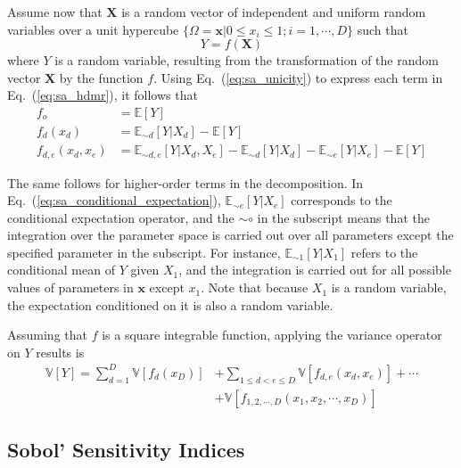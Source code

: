 Assume now that $\mathbf{X}$ is a random vector of independent and uniform random variables over a unit hypercube
$\{\Omega = \mathbf{x} | 0 \leq x_i  \leq 1; i = 1,\cdots, D\}$ such that
\begin{equation}
	Y = f(\mathbf{X})
\label{eq:sa_random_function}
\end{equation}
where $Y$ is a random variable, resulting from the transformation of the random vector $\mathbf{X}$ by the function $f$.
Using Eq.~(\ref{eq:sa_unicity}) to express each term in Eq.~(\ref{eq:sa_hdmr}), it follows that
\begin{equation}
	\begin{split}
		f_o & = \mathbb{E}[Y] \\
	  f_d(x_d) & = \mathbb{E}_{\sim d}[Y|X_d] - \mathbb{E}[Y]\\
    f_{d,e}(x_d,x_e) & = \mathbb{E}_{\sim d,e} [Y|X_d, X_e] - \mathbb{E}_{\sim d}[Y|X_d] - \mathbb{E}_{\sim e}[Y|X_e] - \mathbb{E}[Y] 
	\end{split}
\label{eq:sa_conditional_expectation}
\end{equation}

The same follows for higher-order terms in the decomposition. 
In Eq.~(\ref{eq:sa_conditional_expectation}), $\mathbb{E}_{\sim e} [Y|X_e]$ corresponds to the conditional expectation operator,
and the $\sim\circ$ in the subscript means that the integration over the parameter space is carried out over all parameters except the specified parameter in the subscript.
For instance, $\mathbb{E}_{\sim 1} [Y|X_1]$ refers to the conditional mean of $Y$ given $X_1$, and the integration is carried out for all possible values of parameters in $\mathbf{x}$ except $x_1$.
Note that because $X_1$ is a random variable, the expectation conditioned on it is also a random variable.

Assuming that $f$ is a square integrable function, applying the variance operator on $Y$ results is
\begin{equation}
	\begin{split}
		\mathbb{V}[Y] = \sum_{d=1}^{D} \mathbb{V}[f_d (x_D)] & + \sum_{1 \leq d < e \leq D} \mathbb{V} [f_{d,e} (x_d, x_e)] + \cdots \\
	                                                       & + \mathbb{V} [f_{1,2,\cdots,D} (x_1, x_2, \cdots, x_D)]
		\end{split}
\label{eq:sa_variance_decomposition}
\end{equation}

\subsection{Sobol' Sensitivity Indices}\label{sub:sa_sobol_indices}

